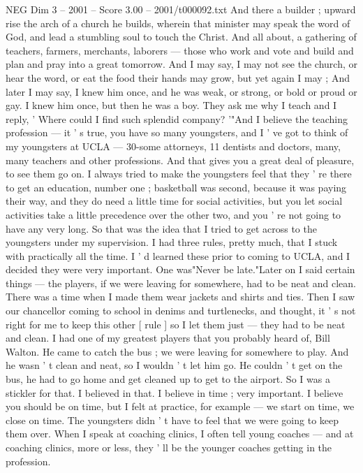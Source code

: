 \begin{textsample}{NEG Dim 3 – 2001 – Score 3.00 – 2001/t000092.txt}
And there a builder ; upward rise the arch of a church he builds, wherein that minister may speak the word of God, and lead a stumbling soul to touch the Christ.
And all about, a gathering of teachers, farmers, merchants, laborers — those who work and vote and build and plan and pray into a great tomorrow.
And I may say, I may not see the church, or hear the word, or eat the food their hands may grow, but yet again I may ; And later I may say, I knew him once, and he was weak, or strong, or bold or proud or gay.
I knew him once, but then he was a boy.
They ask me why I teach and I reply, ' Where could I find such splendid company? '"And I believe the teaching profession — it ' s true, you have so many youngsters, and I ' ve got to think of my youngsters at UCLA — 30-some attorneys, 11 dentists and doctors, many, many teachers and other professions.
And that gives you a great deal of pleasure, to see them go on.
I always tried to make the youngsters feel that they ' re there to get an education, number one ; basketball was second, because it was paying their way, and they do need a little time for social activities, but you let social activities take a little precedence over the other two, and you ' re not going to have any very long.
So that was the idea that I tried to get across to the youngsters under my supervision.
I had three rules, pretty much, that I stuck with practically all the time.
I ' d learned these prior to coming to UCLA, and I decided they were very important.
One was"Never be late."Later on I said certain things — the players, if we were leaving for somewhere, had to be neat and clean.
There was a time when I made them wear jackets and shirts and ties.
Then I saw our chancellor coming to school in denims and turtlenecks, and thought, it ' s not right for me to keep this other [ rule ] so I let them just — they had to be neat and clean.
I had one of my greatest players that you probably heard of, Bill Walton.
He came to catch the bus ; we were leaving for somewhere to play.
And he wasn ' t clean and neat, so I wouldn ' t let him go.
He couldn ' t get on the bus, he had to go home and get cleaned up to get to the airport.
So I was a stickler for that.
I believed in that.
I believe in time ; very important.
I believe you should be on time, but I felt at practice, for example — we start on time, we close on time.
The youngsters didn ' t have to feel that we were going to keep them over.
When I speak at coaching clinics, I often tell young coaches — and at coaching clinics, more or less, they ' ll be the younger coaches getting in the profession.

\end{textsample}
